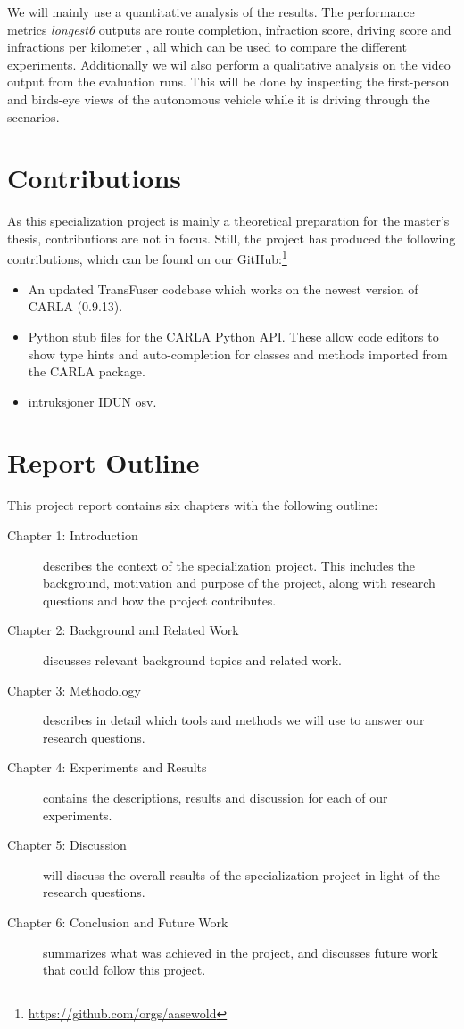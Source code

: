 We will mainly use a quantitative analysis of the results. The performance metrics \textit{longest6} outputs are route completion, infraction score, driving score and infractions per kilometer \cite{transfuser-pami}, all which can be used to compare the different experiments. Additionally we wil also perform a qualitative analysis on the video output from the evaluation runs. This will be done by inspecting the first-person and birds-eye views of the autonomous vehicle while it is driving through the scenarios.

\section{Contributions}
As this specialization project is mainly a theoretical preparation for the master's thesis, contributions are not in focus. Still, the project has produced the following contributions, which can be found on our GitHub:\footnote{\url{https://github.com/orgs/aasewold}}

\begin{itemize}
    \item An updated TransFuser codebase which works on the newest version of CARLA (0.9.13).
    \item Python stub files for the CARLA Python API. These allow code editors to show type hints and auto-completion for classes and methods imported from the CARLA package.
    \item intruksjoner IDUN osv.
\end{itemize}


\section{Report Outline} %
This project report contains six chapters with the following outline:

\begin{description}
    \item[Chapter 1: Introduction] describes the context of the specialization project. This includes the background, motivation and purpose of the project, along with research questions and how the project contributes.
    \item[Chapter 2: Background and Related Work] discusses relevant background topics and related work.
    \item[Chapter 3: Methodology] describes in detail which tools and methods we will use to answer our research questions.
    \item[Chapter 4: Experiments and Results] contains the descriptions, results and discussion for each of our experiments.
    \item[Chapter 5: Discussion] will discuss the overall results of the specialization project in light of the research questions.
    \item[Chapter 6: Conclusion and Future Work] summarizes what was achieved in the project, and discusses future work that could follow this project.
\end{description}
